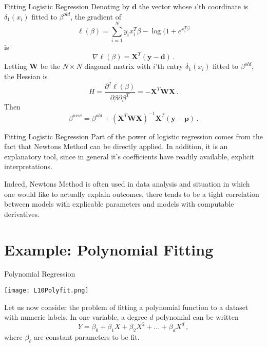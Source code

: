 \documentclass[10pt, table, dvipsnames,xcdraw, handout]{beamer}
\newcommand{\bfX}{\ensuremath{\mathbf{X}}}
\newcommand{\bfy}{\ensuremath{\mathbf{y}}}
\begin{document}
\begin{frame}[fragile]{Fitting Logistic Regression}
Denoting by $\mathbf{d}$ the vector whose $i$'th coordinate is $\delta_1(x_i)$ fitted to $\beta^{old}$, the gradient of
$$
\ell(\beta) = \sum_{i=1}^N y_ix_i^T\beta - \log(1+e^{x^T_i\beta}
$$
is
$$
\nabla\ell(\beta) = \bfX^T(\bfy - \mathbf{d})\,.
$$\pause
Letting $\mathbf{W}$ be the $N\times N$ diagonal matrix with $i$'th entry $\delta_1(x_i)$ fitted to $\beta^{old}$, the Hessian is
$$
H = \frac{\partial^2\ell(\beta)}{\partial \beta\partial \beta^T} = -\bfX^T\mathbf{W}\bfX\,.
$$\pause
Then 
$$
\beta^{new} = \beta^{old} + (\bfX^T\mathbf{W}\bfX)^{-1}\bfX^T(\bfy - \mathbf{p})\,.
$$
\end{frame}



\begin{frame}[fragile]{Fitting Logistic Regression}
Part of the power of logistic regression comes from the fact that Newtons Method can be directly applied. In addition, it is an explanatory tool, since in general it's coefficients have readily available, explicit interpretations. 

Indeed, Newtons Method is often used in data analysis and situation in which one would like to actually explain outcomes, there tends to be a tight correlation between models with explicable parameters and models with computable derivatives.
\end{frame}



\section{Example: Polynomial Fitting}

\begin{frame}[fragile]{Polynomial Regression}
  \begin{minipage}[t][0.5\textheight][t]{\textwidth}
	\centering \texttt{[image: L10Polyfit.png]}
  \end{minipage}
  \vfill
\begin{minipage}[t][0.5\textheight][t]{\textwidth}
Let us now consider the problem of fitting a polynomial function to a dataset with numeric labels. In one variable, a degree $d$ polynomial can be written
$$
Y = \beta_0 + \beta_1 X + \beta_2 X^2 + \ldots + \beta_d X^d\,,
$$
where $\beta_\ell$ are constant parameters to be fit.
\end{minipage}
\end{frame}
\end{document}
